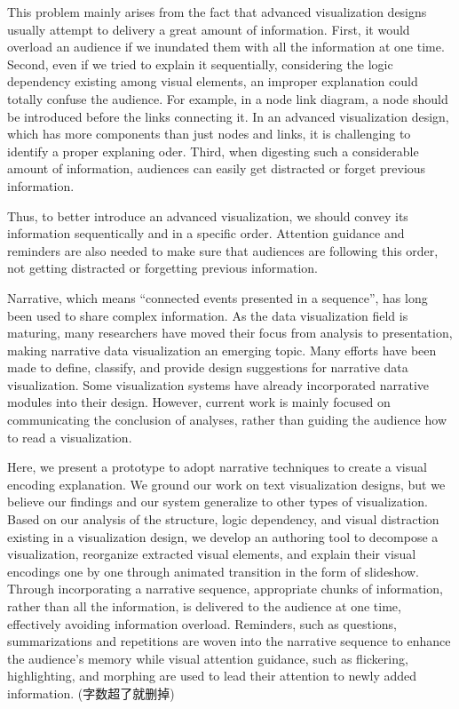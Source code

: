 \documentclass[review,journal]{vgtc}         %
\begin{document}
This problem mainly arises from the fact that advanced visualization designs usually attempt to delivery a great amount of information. First, it would overload an audience if we inundated them with all the information at one time. Second, even if we tried to explain it sequentially, considering the logic dependency existing among visual elements, an improper explanation could totally confuse the audience. For example, in a node link diagram, a node should be introduced before the links connecting it. In an advanced visualization design, which has more components than just nodes and links, it is challenging to identify a proper explaning oder. Third, when digesting such a considerable amount of information, audiences can easily get distracted or forget previous information.   

Thus, to better introduce an advanced visualization, we should convey its information sequentically and in a specific order. Attention guidance and reminders are also needed to make sure that audiences are following this order, not getting distracted or forgetting previous information.

Narrative, which means “connected events presented in a sequence”, has long been used to share complex information. \cite{schmidt_living_2017}As the data visualization field is maturing, many researchers have moved their focus from analysis to presentation, making narrative data visualization an emerging topic\cite{kosara_storytelling:_2013}. Many efforts have been
made to define, classify, and provide design suggestions for narrative data visualization\cite{segel_narrative_2010,hullman_deeper_2013,gershon_what_2001}. Some visualization systems have already incorporated narrative modules into their design\cite{eccles_stories_2007,bryan_temporal_2016}. However, current work is mainly focused on communicating the conclusion of analyses, rather than guiding the audience how to read a visualization. 

Here, we present a prototype to adopt narrative techniques to create a visual encoding explanation. We
ground our work on text visualization designs, but we believe our findings and our system generalize to other types of visualization. Based on our analysis of the structure, logic dependency, and visual distraction existing in a visualization design, we develop an authoring tool to decompose a visualization, reorganize extracted visual elements, and explain their visual encodings one by one through animated transition in the form of slideshow. Through incorporating a narrative sequence, appropriate chunks of information, rather than all the information, is delivered to the audience at one time, effectively avoiding information overload. Reminders, such as questions, summarizations and repetitions are woven into the narrative sequence to enhance the audience’s memory while visual attention guidance, such as flickering, highlighting, and morphing are used to lead their attention to newly added information. (字数超了就删掉)
\end{document}
